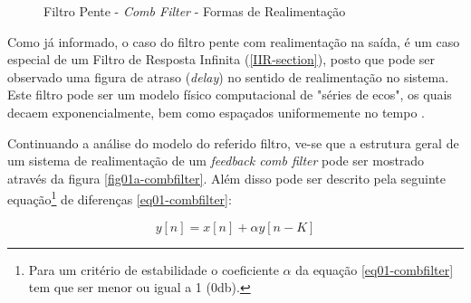 		\begin{figure}[hbt]
			\centering
			\qquad
			\caption{Filtro Pente - \textit{Comb Filter} - Formas de Realimentação}
			\label{fig01-combfilter}
		\end{figure}
		
		Como já informado, o caso do filtro pente com realimentação na saída, é um caso especial de um Filtro de Resposta Infinita (\ref{IIR-section}), posto que pode ser observado uma figura de atraso (\textit{delay}) no sentido de realimentação no sistema. Este filtro pode ser um modelo físico computacional de "séries de ecos", os quais decaem exponencialmente, bem como espaçados uniformemente no tempo \cite{JULIUSO.SMITH2010}.
		
		
		Continuando a análise do modelo do referido filtro, ve-se que a estrutura geral de um sistema de realimentação de um \textit{ feedback comb filter} pode ser mostrado através da figura \ref{fig01a-combfilter}. Além disso pode ser descrito pela seguinte equação\footnote{Para um critério de estabilidade o coeficiente $\alpha$ da equação \ref{eq01-combfilter} tem que ser menor ou igual a 1 (0db).} de diferenças \ref{eq01-combfilter}:
				
		\begin{equation}
			\label{eq01-combfilter}
			y[n] = x[n] + \alpha y[n-K]
		\end{equation}
		
